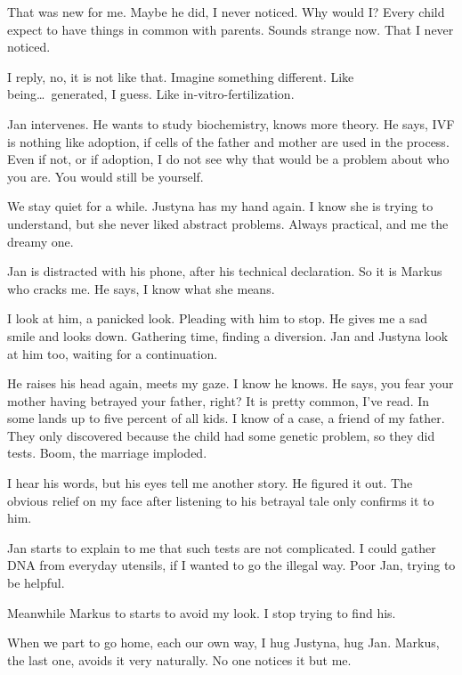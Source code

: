 That was new for me. Maybe he did, I never noticed. Why would I? Every child expect to have things in common with parents. Sounds strange now. That I never noticed.

I reply, no, it is not like that. Imagine something different. Like being\dots~generated, I guess. Like in-vitro-fertilization.

Jan intervenes. He wants to study biochemistry, knows more theory. He says, IVF is nothing like adoption, if cells of the father and mother are used in the process. Even if not, or if adoption, I do not see why that would be a problem about who you are. You would still be yourself. 

We stay quiet for a while. Justyna has my hand again. I know she is trying to understand, but she never liked abstract problems. Always practical, and me the dreamy one. 

Jan is distracted with his phone, after his technical declaration. So it is Markus who cracks me. He says, I know what she means. 

I look at him, a panicked look. Pleading with him to stop. He gives me a sad smile and looks down. Gathering time, finding a diversion. Jan and Justyna look at him too, waiting for a continuation. 

He raises his head again, meets my gaze. I know he knows. He says, you fear your mother having betrayed your father, right? It is pretty common, I've read. In some lands up to five percent of all kids. I know of a case, a friend of my father. They only discovered because the child had some genetic problem, so they did tests. Boom, the marriage imploded.

I hear his words, but his eyes tell me another story. He figured it out. The obvious relief on my face after listening to his betrayal tale only confirms it to him. 

Jan starts to explain to me that such tests are not complicated. I could gather DNA from everyday utensils, if I wanted to go the illegal way. Poor Jan, trying to be helpful.

Meanwhile Markus to starts to avoid my look. I stop trying to find his.

When we part to go home, each our own way, I hug Justyna, hug Jan. Markus, the last one, avoids it very naturally. No one notices it but me.